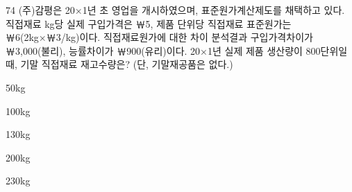 \begin{question}{74}
(주)감평은 20×1년 초 영업을 개시하였으며, 표준원가계산제도를 채택하고 있다. 직접재료 kg당 실제 구입가격은 ￦5, 제품 단위당 직접재료 표준원가는 ￦6(2kg×￦3/kg)이다. 직접재료원가에 대한 차이 분석결과 구입가격차이가 ￦3,000(불리), 능률차이가 ￦900(유리)이다. 20×1년 실제 제품 생산량이 800단위일 때, 기말 직접재료 재고수량은? (단, 기말재공품은 없다.)
\begin{choices}
  \item 50kg
  \item 100kg
  \item 130kg
  \item 200kg
  \item 230kg
\end{choices}
\end{question}
